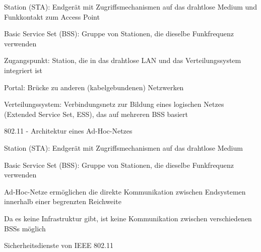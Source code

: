 \documentclass[a4paper]{article}
\begin{document}
\begin{multicols}{3}
      \begin{itemize*}
            \item Station (STA): Endgerät mit Zugriffsmechanismen auf das drahtlose
            Medium und Funkkontakt zum Access Point
            \item Basic Service Set (BSS): Gruppe von Stationen, die dieselbe
            Funkfrequenz verwenden
            \item Zugangspunkt: Station, die in das drahtlose LAN und das
            Verteilungssystem integriert ist
            \item Portal: Brücke zu anderen (kabelgebundenen) Netzwerken
            \item Verteilungssystem: Verbindungsnetz zur Bildung eines logischen Netzes
            (Extended Service Set, ESS), das auf mehreren BSS basiert
      \end{itemize*}

      802.11 - Architektur eines Ad-Hoc-Netzes

      \begin{itemize*}
            \item Station (STA): Endgerät mit Zugriffsmechanismen auf das drahtlose
            Medium
            \item Basic Service Set (BSS): Gruppe von Stationen, die dieselbe
            Funkfrequenz verwenden
            \item Ad-Hoc-Netze ermöglichen die direkte Kommunikation zwischen
            Endsystemen innerhalb einer begrenzten Reichweite
            \item Da es keine Infrastruktur gibt, ist keine Kommunikation zwischen
            verschiedenen BSSs möglich
      \end{itemize*}

      Sicherheitsdienste von IEEE 802.11


\end{multicols}
\end{document}

